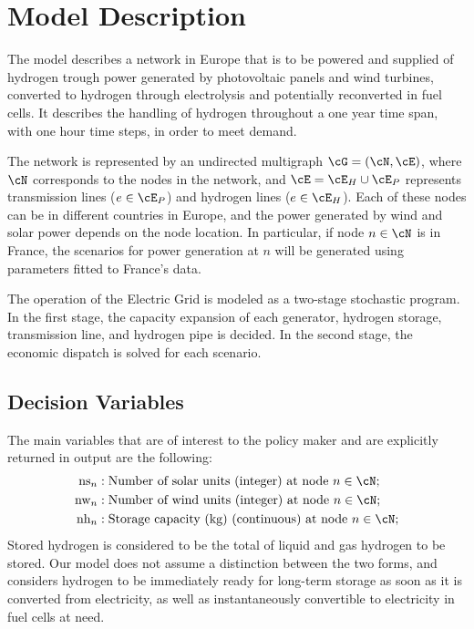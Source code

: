 \documentclass[english]{article}
\numberwithin{definition}{section}
\numberwithin{theorem}{section}
\numberwithin{problem}{section}
\begin{document}
\section{Model Description}
\label{section: model}

The model describes a network in Europe that is to be powered and supplied of hydrogen trough power generated 
by photovoltaic panels and wind turbines, converted to hydrogen through electrolysis and potentially 
reconverted in fuel cells. It describes the handling of hydrogen throughout a one year time span, with
 one hour time steps, in order to meet demand.

The network is represented by an undirected multigraph \(\cG = (\cN, \cE)\), where \(\cN\) corresponds to the
 nodes in the network, and \(\cE = \cE_H \cup \cE_P\) represents transmission lines (\(e \in \cE_P\)) and
  hydrogen lines (\(e \in \cE_H\)). Each of these nodes can be in different countries in Europe, and the power
   generated by wind and solar power depends on the node location. In particular, if node \(n \in \cN\) is in
    France, the scenarios for power generation at \(n\) will be generated using parameters fitted to France's 
    data.

The operation of the Electric Grid is modeled as a two-stage stochastic program. In the first stage,
the capacity expansion of each generator, hydrogen storage, transmission line, and hydrogen pipe is
decided. In the second stage, the economic dispatch is solved for each scenario.






\newpage



\subsection{Decision Variables}
The main variables that are of interest to the policy maker and are explicitly returned in output are the following:
\begin{align*}
    \text{ns}_n & : \text{Number of solar units (integer) at node } n \in \cN; \\
    \text{nw}_n & : \text{Number of wind units (integer) at node } n \in \cN; \\
    \text{nh}_n & : \text{Storage capacity (kg) (continuous) at node } n \in \cN;
\end{align*}
Stored hydrogen is considered to be the total of liquid and gas hydrogen to be stored. Our model does not assume a distinction between the two forms, and considers hydrogen to be immediately ready for long-term storage as soon as it is converted from electricity, as well as instantaneously convertible to electricity in fuel cells at need.
\end{document}
